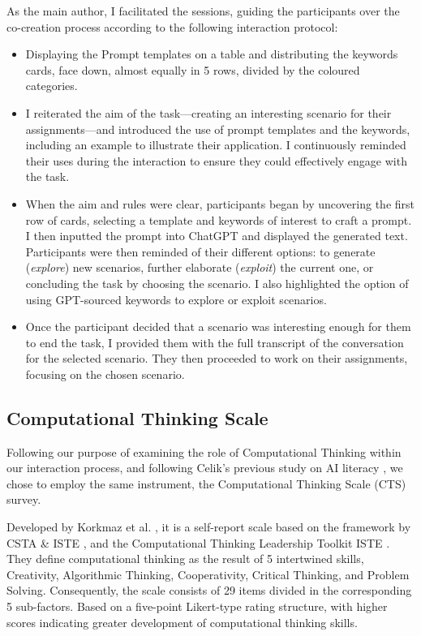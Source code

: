 \documentclass[sn-mathphys, Numbered]{sn-jnl}%
\theoremstyle{thmstyleone}%
\theoremstyle{thmstyletwo}%
\theoremstyle{thmstylethree}%
\begin{document}
As the main author, I facilitated the sessions, guiding the participants over the co-creation process according to the following interaction protocol:
    \begin{itemize}

        \item  Displaying the Prompt templates on a table and distributing the keywords cards, face down, almost equally in 5 rows, divided by the coloured categories.
        \item I reiterated the aim of the task---creating an interesting scenario for their assignments---and introduced the use of prompt templates and the keywords, including an example to illustrate their application. I continuously reminded their uses during the interaction to ensure they could effectively engage with the task.
        \item When the aim and rules were clear, participants began by uncovering the first row of cards, selecting a template and keywords of interest to craft a prompt. I then inputted the prompt into ChatGPT and displayed the generated text. Participants were then reminded of their different options: to generate (\textit{explore}) new scenarios, further elaborate (\textit{exploit}) the current one, or concluding the task by choosing the scenario. I also highlighted the option of using GPT-sourced keywords to explore or exploit scenarios.
        \item Once the participant decided that a scenario was interesting enough for them to end the task, I provided them with the full transcript of the conversation for the selected scenario. They then proceeded to work on their assignments, focusing on the chosen scenario.
    \end{itemize}


\subsection*{Computational Thinking Scale}

Following our purpose of examining the role of Computational Thinking within our interaction process, and following Celik's previous study on AI literacy \parencite*{celik_exploring_2023}, we chose to employ the same instrument, the Computational Thinking Scale (CTS) survey.

Developed by Korkmaz et al. \parencite*{korkmaz_validity_2017-1}, it is a self-report scale based on the framework by CSTA \& ISTE \parencite*{csta_iste_operational_2015}, and the Computational Thinking Leadership Toolkit ISTE \parencite*{iste_computational_2011}. They define computational thinking as the result of 5 intertwined skills, Creativity, Algorithmic Thinking, Cooperativity, Critical Thinking, and Problem Solving. Consequently, the scale consists of 29 items divided in the corresponding 5 sub-factors. Based on a five-point Likert-type rating structure, with higher scores indicating greater development of computational thinking skills. 
\end{document}
